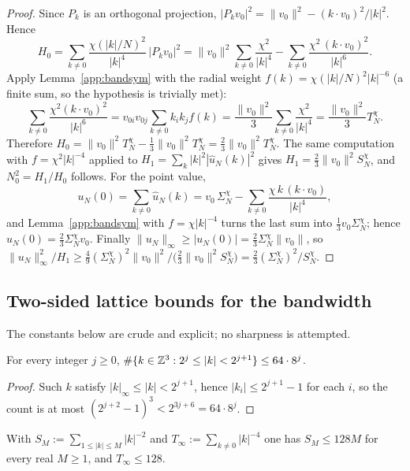 \begin{proof}
Since $P_k$ is an orthogonal projection,
$|P_kv_0|^2=\|v_0\|^2-(k\cdot v_0)^2/|k|^2$. Hence
\[
H_0=\sum_{k\neq0}\frac{\chi(|k|/N)^2}{|k|^4}\,|P_kv_0|^2
=\|v_0\|^2\sum_{k\neq0}\frac{\chi^2}{|k|^4}
-\sum_{k\neq0}\frac{\chi^2\,(k\cdot v_0)^2}{|k|^6}.
\]
Apply Lemma~\ref{app:bandsym} with the radial weight
$f(k)=\chi(|k|/N)^2|k|^{-6}$ (a finite sum, so the hypothesis is
trivially met):
\[
\sum_{k\neq0}\frac{\chi^2(k\cdot v_0)^2}{|k|^6}
=v_{0i}v_{0j}\sum_{k\neq0}k_ik_jf(k)
=\frac{\|v_0\|^2}{3}\sum_{k\neq0}\frac{\chi^2}{|k|^4}
=\frac{\|v_0\|^2}{3}T_N^\chi .
\]
Therefore $H_0=\|v_0\|^2T_N^\chi-\frac13\|v_0\|^2T_N^\chi
=\frac23\|v_0\|^2T_N^\chi$. The same computation with
$f=\chi^2|k|^{-4}$ applied to
$H_1=\sum_{k}|k|^2|\hat u_N(k)|^2$ gives
$H_1=\frac23\|v_0\|^2S_N^\chi$, and $N_0^2=H_1/H_0$ follows. For the
point value,
\[
u_N(0)=\sum_{k\neq0}\hat u_N(k)
=v_0\,\Sigma_N^\chi-\sum_{k\neq0}\frac{\chi\,k\,(k\cdot v_0)}{|k|^4},
\]
and Lemma~\ref{app:bandsym} with $f=\chi|k|^{-4}$ turns the last sum
into $\frac13v_0\Sigma_N^\chi$; hence
$u_N(0)=\frac23\Sigma_N^\chi v_0$. Finally
$\|u_N\|_\infty\ge|u_N(0)|=\frac23\Sigma_N^\chi\|v_0\|$, so
$\|u_N\|_\infty^2/H_1\ge\frac49(\Sigma_N^\chi)^2\|v_0\|^2
\big/\big(\frac23\|v_0\|^2S_N^\chi\big)
=\frac23(\Sigma_N^\chi)^2/S_N^\chi$.
\end{proof}

\subsection{Two-sided lattice bounds for the bandwidth}
\label{app:lattice}

The constants below are crude and explicit; no sharpness is attempted.

\begin{lemma}\label{app:shell}
For every integer $j\ge0$,
$\#\{k\in\mathbb Z^3:2^j\le|k|<2^{j+1}\}\le64\cdot8^{j}$.
\end{lemma}

\begin{proof}
Such $k$ satisfy $|k|_\infty\le|k|<2^{j+1}$, hence
$|k_i|\le2^{j+1}-1$ for each $i$, so the count is at most
$(2^{j+2}-1)^3<2^{3j+6}=64\cdot8^{j}$.
\end{proof}

\begin{lemma}\label{app:upper}
With $S_M:=\sum_{1\le|k|\le M}|k|^{-2}$ and
$T_\infty:=\sum_{k\neq0}|k|^{-4}$ one has
$S_M\le128M$ for every real $M\ge1$, and $T_\infty\le128$.
\end{lemma}

